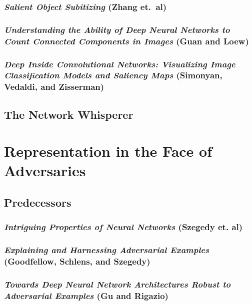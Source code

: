 \documentclass[showabstract,showacknowledgments,showpreface,showdedication]{iuphd}
\begin{document}
\subsection{\textit{Salient Object Subitizing} (Zhang et.\ al)}

\subsection{\textit{Understanding the Ability of Deep Neural Networks to Count Connected Components in Images} (Guan and Loew)}

\subsection{\textit{Deep Inside Convolutional Networks: Visualizing Image Classification Models and Saliency Maps} (Simonyan, Vedaldi, and Zisserman)}


\section{The Network Whisperer}
\label{detectionasproofofrepresentation}




\chapter{Representation in the Face of Adversaries}

\section{Predecessors}

\subsection{\textit{Intriguing Properties of Neural Networks} (Szegedy et. al)}

\subsection{\textit{Explaining and Harnessing Adversarial Examples} (Goodfellow, Schlens, and Szegedy)}

\subsection{\textit{Towards Deep Neural Network Architectures Robust to Adversarial Examples} (Gu and Rigazio)}

\end{document}
